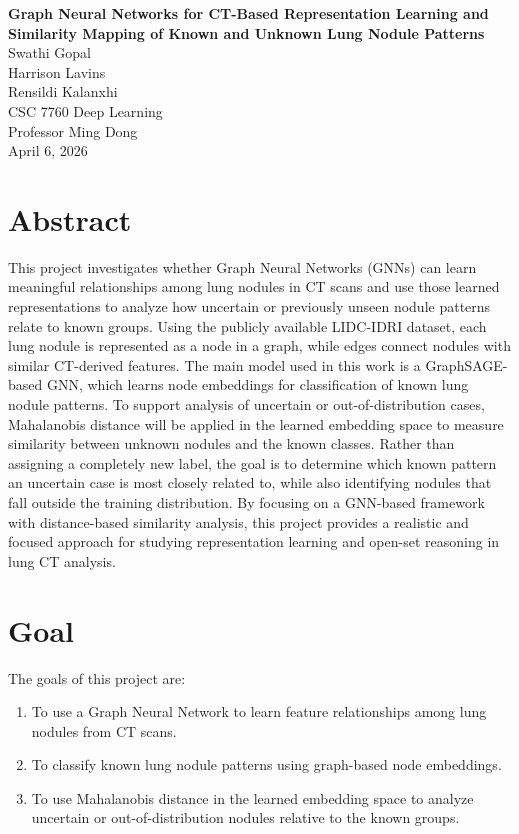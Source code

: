 \documentclass[12pt]{article}
\begin{document}
\begin{center}
    {\Large \textbf{Graph Neural Networks for CT-Based Representation Learning and Similarity Mapping of Known and Unknown Lung Nodule Patterns}}\\[1.5em]

    Swathi Gopal\\
    Harrison Lavins\\
    Rensildi Kalanxhi\\[1em]

    CSC 7760 Deep Learning\\
    Professor Ming Dong\\
    April 6, 2026
\end{center}

\section*{Abstract}

This project investigates whether Graph Neural Networks (GNNs) can learn meaningful relationships among lung nodules in CT scans and use those learned representations to analyze how uncertain or previously unseen nodule patterns relate to known groups. Using the publicly available LIDC-IDRI dataset, each lung nodule is represented as a node in a graph, while edges connect nodules with similar CT-derived features. The main model used in this work is a GraphSAGE-based GNN, which learns node embeddings for classification of known lung nodule patterns. To support analysis of uncertain or out-of-distribution cases, Mahalanobis distance will be applied in the learned embedding space to measure similarity between unknown nodules and the known classes. Rather than assigning a completely new label, the goal is to determine which known pattern an uncertain case is most closely related to, while also identifying nodules that fall outside the training distribution. By focusing on a GNN-based framework with distance-based similarity analysis, this project provides a realistic and focused approach for studying representation learning and open-set reasoning in lung CT analysis.

\section*{Goal}

The goals of this project are:

\begin{enumerate}[label=\arabic*.]
    \item To use a Graph Neural Network to learn feature relationships among lung nodules from CT scans.
    \item To classify known lung nodule patterns using graph-based node embeddings.
    \item To use Mahalanobis distance in the learned embedding space to analyze uncertain or out-of-distribution nodules relative to the known groups.
\end{enumerate}
\end{document}
